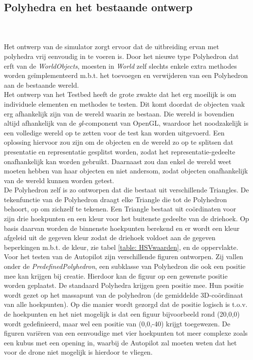 \subsection{Polyhedra en het bestaande ontwerp}
\\\\
Het ontwerp van de simulator zorgt ervoor dat de uitbreiding ervan met polyhedra vrij eenvoudig in te voeren is. Door het nieuwe type Polyhedron dat erft van de \textit{WorldObjects}, moesten in \textit{World} zelf slechts enkele extra methodes worden ge\"implementeerd m.b.t. het toevoegen en verwijderen van een Polyhedron aan de bestaande wereld.\\
\noindent
Het ontwerp van het Testbed heeft de grote zwakte dat het erg moeilijk is om individuele elementen en methodes te testen. Dit komt doordat de objecten vaak erg afhankelijk zijn van de wereld waarin ze bestaan. Die wereld is bovendien altijd afhankelijk van de \textit{gl}-component van OpenGL, waardoor het noodzakelijk is een volledige wereld op te zetten voor de test kan worden uitgevoerd. Een oplossing hiervoor zou zijn om de objecten en de wereld zo op te splitsen dat presentatie en representatie gesplitst worden, zodat het representatie-gedeelte onafhankelijk kan worden gebruikt. Daarnaast zou dan enkel de wereld weet moeten hebben van haar objecten en niet andersom, zodat objecten onafhankelijk van de wereld kunnen worden getest.\\

\noindent 
De Polyhedron zelf is zo ontworpen dat die bestaat uit verschillende Triangles. De tekenfunctie van de Polyhedron draagt elke Triangle die tot de Polyhedron behoort, op om zichzelf te tekenen. Een Triangle bestaat uit co\"ordinaten voor zijn drie hoekpunten en een kleur voor het buitenste gedeelte van de driehoek. Op basis daarvan worden de binnenste hoekpunten berekend en er wordt een kleur afgeleid uit de gegeven kleur zodat de driehoek voldoet aan de gegeven beperkingen m.b.t. de kleur, zie tabel \ref{table: HSVwaarden}, en de oppervlakte.\\
\noindent
Voor het testen van de Autopilot zijn verschillende figuren ontworpen. Zij vallen onder de \textit{PredefinedPolyhedron}, een subklasse van Polyhedron die ook een positie mee kan krijgen bij creatie. Hierdoor kan de figuur op een gewenste positie worden geplaatst. De standaard Polyhedra krijgen geen positie mee. Hun positie wordt gezet op het massapunt van de polyhedron (de gemiddelde 3D-co\"ordinaat van alle hoekpunten). Op die manier wordt gezorgd dat de positie logisch is t.o.v. de hoekpunten en het niet mogelijk is dat een figuur bijvoorbeeld rond (20,0,0) wordt gedefinieerd, maar wel een positie van (0,0,-40) krijgt toegewezen. De figuren vari\"eren van een eenvoudige met vier hoekpunten tot meer complexe zoals een kubus met een opening in, waarbij de Autopilot zal moeten weten dat het voor de drone niet mogelijk is hierdoor te vliegen.

